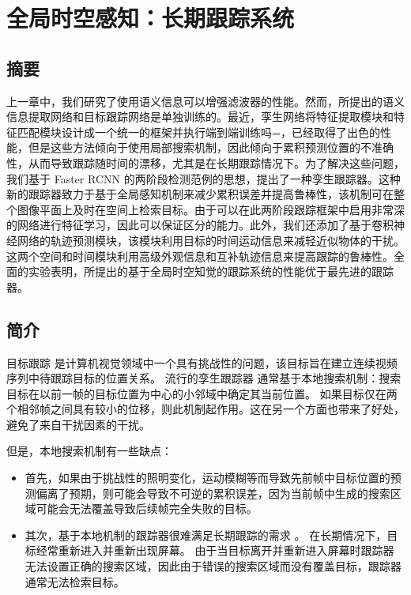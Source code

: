 \chapter{全局时空感知：长期跟踪系统}\label{chap:globally}

\section{摘要}
上一章中，我们研究了使用语义信息可以增强滤波器的性能。然而，所提出的语义信息提取网络和目标跟踪网络是单独训练的。最近，孪生网络将特征提取模块和特征匹配模块设计成一个统一的框架并执行端到端训练吗=，已经取得了出色的性能，但是这些方法倾向于使用局部搜索机制，因此倾向于累积预测位置的不准确性，从而导致跟踪随时间的漂移，尤其是在长期跟踪情况下。为了解决这些问题，我们基于 Faster RCNN 的两阶段检测范例的思想，提出了一种孪生跟踪器。这种新的跟踪器致力于基于全局感知机制来减少累积误差并提高鲁棒性，该机制可在整个图像平面上及时在空间上检索目标。由于可以在此两阶段跟踪框架中启用非常深的网络进行特征学习，因此可以保证区分的能力。此外，我们还添加了基于卷积神经网络的轨迹预测模块，该模块利用目标的时间运动信息来减轻近似物体的干扰。
这两个空间和时间模块利用高级外观信息和互补轨迹信息来提高跟踪的鲁棒性。全面的实验表明，所提出的基于全局时空知觉的跟踪系统的性能优于最先进的跟踪器。

\section{简介}
\label{sec:intro}

目标跟踪 \cite{Leang2018OnlineFO, Wang2019VisualOT, Zhang2018UsingFL} 是计算机视觉领域中一个具有挑战性的问题，该目标旨在建立连续视频序列中待跟踪目标的位置关系。
流行的孪生跟踪器 \cite{SiamFC, SiamRPN, Wang2018SiamMask} 通常基于本地搜索机制：搜索目标在以前一帧的目标位置为中心的小邻域中确定其当前位置。
如果目标仅在两个相邻帧之间具有较小的位移，则此机制起作用。这在另一个方面也带来了好处，避免了来自干扰因素的干扰。

但是，本地搜索机制有一些缺点：

\begin{itemize}
\item 首先，如果由于挑战性的照明变化，运动模糊等而导致先前帧中目标位置的预测偏离了预期，则可能会导致不可逆的累积误差，因为当前帧中生成的搜索区域可能会无法覆盖导致后续帧完全失败的目标。
\item 其次，基于本地机制的跟踪器很难满足长期跟踪的需求 \cite{kalal2011tracking, hong2015multi}。
在长期情况下，目标经常重新进入并重新出现屏幕。
由于当目标离开并重新进入屏幕时跟踪器无法设置正确的搜索区域，因此由于错误的搜索区域而没有覆盖目标，跟踪器通常无法检索目标。
\end{itemize}


